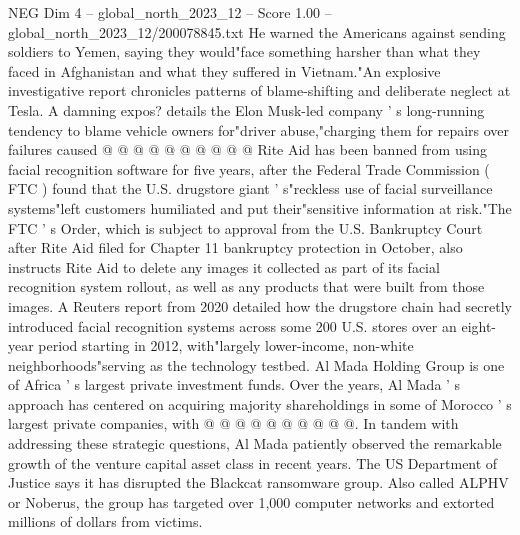 \begin{textsample}{NEG Dim 4 – global\_north\_2023\_12 – Score 1.00 – global\_north\_2023\_12/200078845.txt}
He warned the Americans against sending soldiers to Yemen, saying they would"face something harsher than what they faced in Afghanistan and what they suffered in Vietnam."An explosive investigative report chronicles patterns of blame-shifting and deliberate neglect at Tesla.
A damning expos? details the Elon Musk-led company ' s long-running tendency to blame vehicle owners for"driver abuse,"charging them for repairs over failures caused @ @ @ @ @ @ @ @ @ @ Rite Aid has been banned from using facial recognition software for five years, after the Federal Trade Commission ( FTC ) found that the U.S. drugstore giant ' s"reckless use of facial surveillance systems"left customers humiliated and put their"sensitive information at risk."The FTC ' s Order, which is subject to approval from the U.S.
Bankruptcy Court after Rite Aid filed for Chapter 11 bankruptcy protection in October, also instructs Rite Aid to delete any images it collected as part of its facial recognition system rollout, as well as any products that were built from those images.
A Reuters report from 2020 detailed how the drugstore chain had secretly introduced facial recognition systems across some 200 U.S. stores over an eight-year period starting in 2012, with"largely lower-income, non-white neighborhoods"serving as the technology testbed.
Al Mada Holding Group is one of Africa ' s largest private investment funds.
Over the years, Al Mada ' s approach has centered on acquiring majority shareholdings in some of Morocco ' s largest private companies, with @ @ @ @ @ @ @ @ @ @.
In tandem with addressing these strategic questions, Al Mada patiently observed the remarkable growth of the venture capital asset class in recent years.
The US Department of Justice says it has disrupted the Blackcat ransomware group.
Also called ALPHV or Noberus, the group has targeted over 1,000 computer networks and extorted millions of dollars from victims.

\end{textsample}
